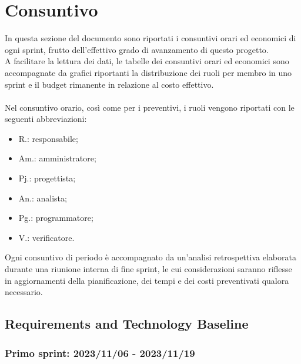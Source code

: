 \chapter{Consuntivo}\label{chap:consuntivo} 
In questa sezione del documento sono riportati i consuntivi orari ed economici di ogni sprint, frutto dell'effettivo grado di avanzamento di questo progetto.\\
A facilitare la lettura dei dati, le tabelle dei consuntivi orari ed economici sono accompagnate da grafici riportanti la distribuzione dei ruoli per membro in uno sprint e il budget rimanente in relazione al costo effettivo.\\ \\
Nel consuntivo orario, così come per i preventivi, i ruoli vengono riportati con le seguenti abbreviazioni:
\begin{itemize}
    \item R.: responsabile;
    \item Am.: amministratore;
    \item Pj.: progettista;
    \item An.: analista;
    \item Pg.: programmatore;
    \item V.: verificatore.
\end{itemize}
Ogni consuntivo di periodo è accompagnato da un'analisi retrospettiva elaborata durante una riunione interna di fine sprint, le cui considerazioni saranno riflesse in aggiornamenti della pianificazione, dei tempi e dei costi preventivati qualora necessario.
\newpage

\section{Requirements and Technology Baseline}
\subsection{Primo sprint: 2023/11/06 - 2023/11/19}
